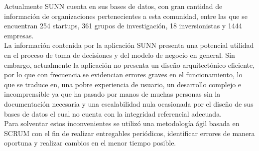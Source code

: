 Actualmente   SUNN   cuenta   en   sus   bases   de   datos, con   gran   cantidad   de   información   de   organizaciones pertenecientes a esta comunidad, entre las que se encuentran 254 startups, 361 grupos de investigación, 18 inversionistas y 1444 empresas.\\

La   información   contenida   por   la   aplicación   SUNN presenta  una  potencial  utilidad  en  el  proceso  de  toma de  decisiones  y  del  modelo  de  negocio  en  general.    Sin
embargo,  actualmente  la  aplicación  no  presenta  un  diseño arquitectónico   eficiente,   por   lo   que   con   frecuencia   se evidencian  errores  graves  en  el  funcionamiento,  lo  que  se
traduce en, una pobre experiencia de usuario, un desarrollo complejo  e  incomprensible  ya  que  ha  pasado  por  manos de  muchas  personas  sin  la  documentación  necesaria  y  una escalabilidad  nula  ocasionada  por  el  diseño  de  sus  bases de  datos  el  cual  no  cuenta  con  la  integridad  referencial adecuada.\\

Para   solventar   estos   inconvenientes   se   utilizó   una metodología  ágil  basada  en  SCRUM  con  el  fin  de  realizar entregables  periódicos,  identificar  errores  de  manera  oportuna y realizar cambios en el menor tiempo posible.


